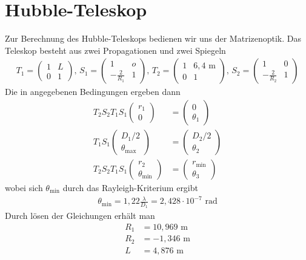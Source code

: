 \documentclass[twoside,colorback,accentcolor=tud4c,11pt]{tudreport}
\begin{document}
\section{Hubble-Teleskop}
Zur Berechnung des Hubble-Teleskops bedienen wir uns der Matrizenoptik. Das Teleskop besteht aus zwei Propagationen und zwei Spiegeln
\begin{align}
T_1=\begin{pmatrix}
1&L\\
0&1
\end{pmatrix},\,
S_1=\begin{pmatrix}
1&o\\
-\frac{2}{R_1}&1
\end{pmatrix},\,
T_2=\begin{pmatrix}
1&6,4\text{ m}\\
0&1
\end{pmatrix},\,
S_2=\begin{pmatrix}
1&0\\
-\frac{2}{R_2}&1
\end{pmatrix}
\end{align} 
Die in \cite{anl} angegebenen Bedingungen ergeben dann
\begin{align}
T_2S_2T_1S_1\begin{pmatrix}
r_1\\
0
\end{pmatrix}
&=\begin{pmatrix}
0\\
\theta_1
\end{pmatrix}\\
T_1S_1\begin{pmatrix}
D_1/2\\
\theta_{\text{max}}
\end{pmatrix}
&=\begin{pmatrix}
D_2/2\\
\theta_2
\end{pmatrix}\\
T_2S_2T_1S_1\begin{pmatrix}
r_2\\
\theta_{\text{min}}
\end{pmatrix}
&=\begin{pmatrix}
r_{\text{min}}\\
\theta_3
\end{pmatrix}
\end{align}
wobei sich $ \theta_{\text{min}} $ durch das Rayleigh-Kriterium ergibt
\begin{align}
\theta_{\text{min}}=1,22\frac{\lambda}{D_1}=2,428\cdot 10^{-7}\text{ rad}
\end{align}
Durch lösen der Gleichungen erhält man
\begin{align}
R_1&=10,969\text{ m}\\
R_2&=-1,346\text{ m}\\
L&=4,876\text{ m}
\end{align}
\end{document}
